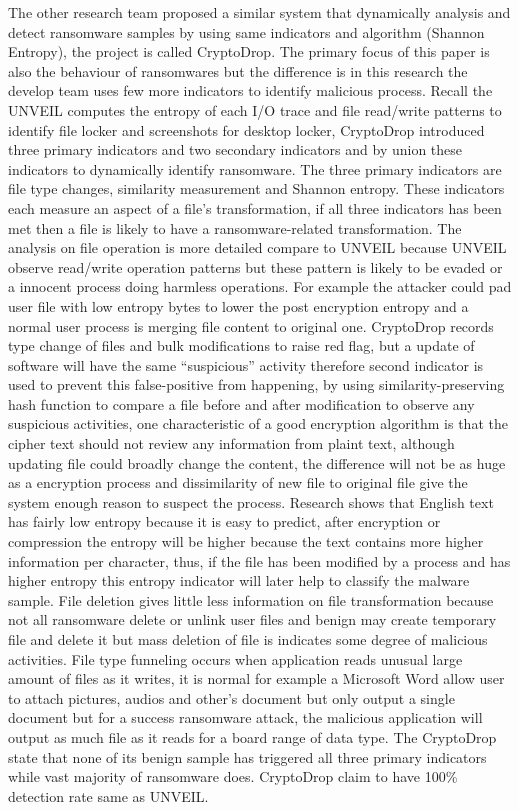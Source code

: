 \documentclass[]{PLR-ShaofengLiu}
\begin{document}
The other research team proposed a similar system that dynamically analysis 
and detect ransomware samples by using same indicators and algorithm
(Shannon Entropy), the project is called CryptoDrop\cite{CryptoDrop}. The primary focus of 
this paper is also the behaviour of ransomwares but the difference is in 
this research the develop team uses few more indicators to identify 
malicious process. Recall the UNVEIL computes the entropy of each I/O 
trace and file read/write patterns to identify file locker and screenshots 
for desktop locker, CryptoDrop introduced three primary indicators and two 
secondary indicators and by union these indicators to dynamically identify 
ransomware. The three primary indicators are file type changes, similarity 
measurement and Shannon entropy. These indicators each measure an aspect 
of a file’s transformation, if all three indicators has been met then a 
file is likely to have a ransomware-related transformation. The analysis 
on file operation is more detailed compare to UNVEIL because UNVEIL 
observe read/write operation patterns but these pattern is likely to be 
evaded or a innocent process doing harmless operations. For example the 
attacker could pad user file with low entropy bytes to lower the post 
encryption entropy and a normal user process is merging file content to 
original one. CryptoDrop records type change of files and bulk 
modifications to raise red flag, but a update of software will have the 
same “suspicious” activity therefore second indicator is used to prevent 
this false-positive from happening, by using similarity-preserving hash 
function to compare a file before and after modification to observe any 
suspicious activities, one characteristic of a good encryption algorithm 
is that the cipher text should not review any information from plaint 
text, although updating file could broadly change the content, the 
difference will not be as huge as a encryption process and dissimilarity 
of new file to original file give the system enough reason to suspect the
 process. Research shows that English text has fairly low entropy because 
 it is easy to predict, after encryption or compression the entropy will 
 be higher because the text contains more higher information per character, 
 thus, if the file has been modified by a process and has higher entropy 
 this entropy indicator will later help to classify the malware sample. 
 File deletion gives little less information on file transformation 
 because not all ransomware delete or unlink user files and benign may 
 create temporary file and delete it but mass deletion of file is 
 indicates some degree of malicious activities. File type funneling occurs 
 when application reads unusual large amount of files as it writes, it is 
 normal for example a Microsoft Word allow user to attach pictures, audios 
 and other’s document but only output a single document but for a success 
 ransomware attack, the malicious application will output as much file as 
 it reads for a board range of data type. The CryptoDrop state that none 
 of its benign sample has triggered all three primary indicators while 
 vast majority of ransomware does. CryptoDrop claim to have 100\% 
 detection rate same as UNVEIL. 
\end{document}
